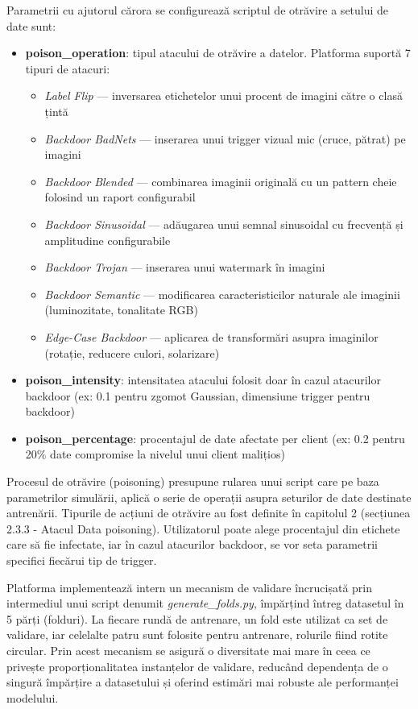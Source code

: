 \documentclass[../../main.tex]{subfiles}
\begin{document}
    Parametrii cu ajutorul cărora se configurează scriptul de otrăvire a setului de date sunt:
    \begin{itemize}
        \item \textbf{poison\_operation}: tipul atacului de otrăvire a datelor. Platforma suportă 7 tipuri de atacuri:
        \begin{itemize}
            \item \textit{Label Flip} --- inversarea etichetelor unui procent de imagini către o clasă țintă
            \item \textit{Backdoor BadNets} --- inserarea unui trigger vizual mic (cruce, pătrat) pe imagini
            \item \textit{Backdoor Blended} --- combinarea imaginii originală cu un pattern cheie folosind un raport configurabil
            \item \textit{Backdoor Sinusoidal} --- adăugarea unui semnal sinusoidal cu frecvență și amplitudine configurabile
            \item \textit{Backdoor Trojan} --- inserarea unui watermark în imagini
            \item \textit{Backdoor Semantic} --- modificarea caracteristicilor naturale ale imaginii (luminozitate, tonalitate RGB)
            \item \textit{Edge-Case Backdoor} --- aplicarea de transformări asupra imaginilor (rotație, reducere culori, solarizare)
        \end{itemize}
        \item \textbf{poison\_intensity}: intensitatea atacului folosit doar în cazul atacurilor backdoor (ex: 0.1 pentru zgomot Gaussian, dimensiune trigger pentru backdoor)
            \item \textbf{poison\_percentage}: procentajul de date afectate per client (ex: 0.2 pentru 20\% date compromise la nivelul unui client malițios)
    \end{itemize}

    Procesul de otrăvire (poisoning) presupune rularea unui script care pe baza parametrilor simulării, aplică o serie de operații asupra seturilor de date destinate antrenării. Tipurile de acțiuni de otrăvire au fost definite în capitolul 2 (secțiunea 2.3.3 - Atacul Data poisoning). Utilizatorul poate alege procentajul din etichete care să fie infectate, iar în cazul atacurilor backdoor, se vor seta parametrii specifici fiecărui tip de trigger.

    Platforma implementează intern un mecanism de validare încrucișată prin intermediul unui script denumit \textit{generate\_folds.py}, împărțind întreg datasetul în 5 părți (folduri). La fiecare rundă de antrenare, un fold este utilizat ca set de validare, iar celelalte patru sunt folosite pentru antrenare, rolurile fiind rotite circular. Prin acest mecanism se asigură o diversitate mai mare în ceea ce privește proporționalitatea instanțelor de validare, reducând dependența de o singură împărțire a datasetului și oferind estimări mai robuste ale performanței modelului.
\end{document}
